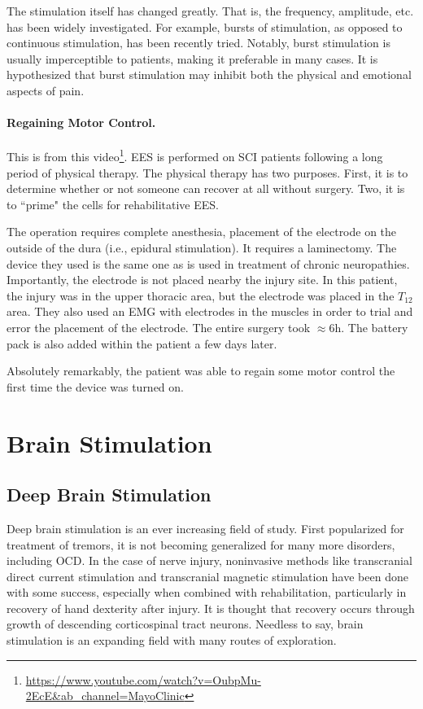 \documentclass[12pt]{report}
\begin{document}
The stimulation itself has changed greatly. That is, the frequency, amplitude, etc. has been widely investigated. For example, bursts of stimulation, as opposed to continuous stimulation, has been recently tried. Notably, burst stimulation is usually imperceptible to patients, making it preferable in many cases. It is hypothesized that burst stimulation may inhibit both the physical and emotional aspects of pain. 

\subsubsection{Regaining Motor Control.}

This is from this video\footnote{\url{https://www.youtube.com/watch?v=OubpMu-2EcE\&ab_channel=MayoClinic}}. EES is performed on SCI patients following a long period of physical therapy. The physical therapy has two purposes. First, it is to determine whether or not someone can recover at all without surgery. Two, it is to ``prime" the cells for rehabilitative EES.\newline

The operation requires complete anesthesia, placement of the electrode on the outside of the dura (i.e., epidural stimulation). It requires a laminectomy. The device they used is the same one as is used in treatment of chronic neuropathies. Importantly, the electrode is not placed nearby the injury site. In this patient, the injury was in the upper thoracic area, but the electrode was placed in the $T_{12}$ area. They also used an EMG with electrodes in the muscles in order to trial and error the placement of the electrode. The entire surgery took $\approx 6$h. The battery pack is also added within the patient a few days later.\newline

Absolutely remarkably, the patient was able to regain some motor control the first time the device was turned on. 




\chapter{Brain Stimulation}

\section{Deep Brain Stimulation}

Deep brain stimulation is an ever increasing field of study. First popularized for treatment of tremors, it is not becoming generalized for many more disorders, including OCD. In the case of nerve injury, noninvasive methods like transcranial direct current stimulation and transcranial magnetic stimulation have been done with some success, especially when combined with rehabilitation, particularly in recovery of hand dexterity after injury. It is thought that recovery occurs through growth of descending corticospinal tract neurons. Needless to say, brain stimulation is an expanding field with many routes of exploration. 
\end{document}
